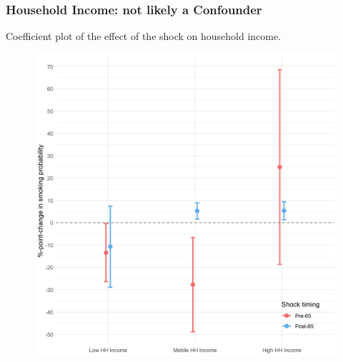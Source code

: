 \documentclass[10pt,compress,xcolor=dvipsnames,aspectratio=169]{beamer}    %
\newcounter{ex}
\newcommand{\1}[1]{\mathrm{1\hspace*{-2.5pt}l}[#1]}	%
\begin{document}
\begin{frame}
\frametitle{Household Income: not likely a Confounder}
Coefficient plot of the effect of the shock on household income.
\begin{figure}[hbtp]
\centering
\includegraphics[height=0.8\textheight]{../../3_output/shock_effects/hhinc_6070_100_cvplot.png}
\label{fig:hhinc}
\end{figure}
\end{frame}

\end{document}
